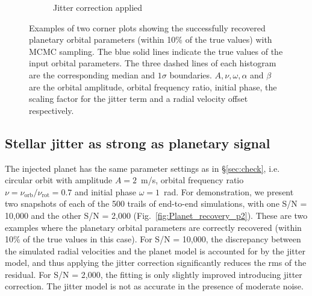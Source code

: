 \begin{figure}[tbp]
\begin{subfigure}[b]{0.49\textwidth}
        \caption{Jitter correction applied}
    \end{subfigure}	
    \caption[Corner plots of MCMC]
    {Examples of two corner plots showing the successfully recovered planetary orbital parameters (within 10\% of the true values) with MCMC sampling. The blue solid lines indicate the true values of the input orbital parameters. The three dashed lines of each histogram are the corresponding median and $1\sigma$ boundaries. $A, \nu, \omega, \alpha$ and $\beta$ are the orbital amplitude, orbital frequency ratio, initial phase, the scaling factor for the jitter term and a radial velocity offset respectively.}
\label{fig:Corner}
\end{figure}    

\subsection{Stellar jitter as strong as planetary signal}

The injected planet has the same parameter settings as in \S\ref{sec:check}, i.e. circular orbit with amplitude $A = 2$~m/s, orbital frequency ratio $\nu = \nu_\text{orb}/\nu_\text{rot}= 0.7$ and initial phase $\omega = 1$~rad. For demonstration, we present two snapshots of each of the 500 trails of end-to-end simulations, with one S/N = 10,000 and the other S/N = 2,000 (Fig.~\ref{fig:Planet_recovery_p2}). These are two examples where the planetary orbital parameters are correctly recovered (within 10\% of the true values in this case). For S/N = 10,000, the discrepancy between the simulated radial velocities and the planet model is accounted for by the jitter model, and thus applying the jitter correction significantly reduces the rms of the residual. For S/N = 2,000, the fitting is only slightly improved introducing jitter correction. The jitter model is not as accurate in the presence of moderate noise. 

